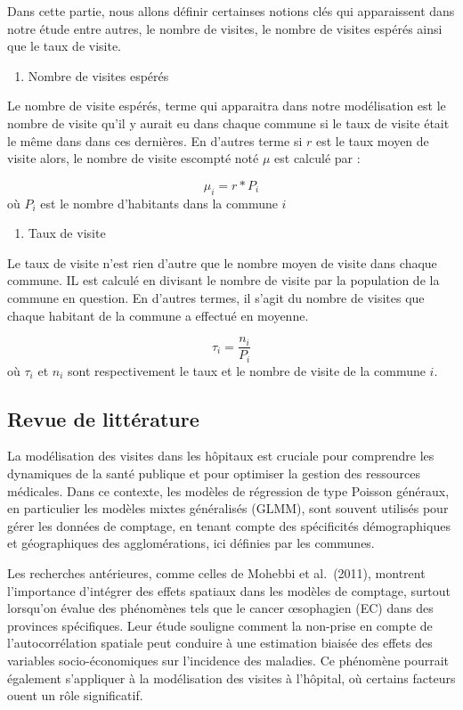 \documentclass[
]{article}
\providecommand{\tightlist}{%
  \setlength{\itemsep}{0pt}\setlength{\parskip}{0pt}}
\begin{document}
Dans cette partie, nous allons définir certainses notions clés qui
apparaissent dans notre étude entre autres, le nombre de visites, le
nombre de visites espérés ainsi que le taux de visite.

\begin{enumerate}
\def\labelenumi{\arabic{enumi}.}
\tightlist
\item
  Nombre de visites espérés
\end{enumerate}

Le nombre de visite espérés, terme qui apparaitra dans notre
modélisation est le nombre de visite qu'il y aurait eu dans chaque
commune si le taux de visite était le même dans dans ces dernières. En
d'autres terme si \(r\) est le taux moyen de visite alors, le nombre de
visite escompté noté \(\mu\) est calculé par :

\[ \mu_i = r * P_i\] où \(P_i\) est le nombre d'habitants dans la
commune \(i\)

\begin{enumerate}
\def\labelenumi{\arabic{enumi}.}
\setcounter{enumi}{1}
\tightlist
\item
  Taux de visite
\end{enumerate}

Le taux de visite n'est rien d'autre que le nombre moyen de visite dans
chaque commune. IL est calculé en divisant le nombre de visite par la
population de la commune en question. En d'autres termes, il s'agit du
nombre de visites que chaque habitant de la commune a effectué en
moyenne.

\[\tau_i = \frac{n_i}{P_i}\] où \(\tau_i\) et \(n_i\) sont
respectivement le taux et le nombre de visite de la commune \(i\).

\subsection{Revue de littérature}\label{revue-de-littuxe9rature}

La modélisation des visites dans les hôpitaux est cruciale pour
comprendre les dynamiques de la santé publique et pour optimiser la
gestion des ressources médicales. Dans ce contexte, les modèles de
régression de type Poisson généraux, en particulier les modèles mixtes
généralisés (GLMM), sont souvent utilisés pour gérer les données de
comptage, en tenant compte des spécificités démographiques et
géographiques des agglomérations, ici définies par les communes.

Les recherches antérieures, comme celles de Mohebbi et al.~(2011),
montrent l'importance d'intégrer des effets spatiaux dans les modèles de
comptage, surtout lorsqu'on évalue des phénomènes tels que le cancer
œsophagien (EC) dans des provinces spécifiques. Leur étude souligne
comment la non-prise en compte de l'autocorrélation spatiale peut
conduire à une estimation biaisée des effets des variables
socio-économiques sur l'incidence des maladies. Ce phénomène pourrait
également s'appliquer à la modélisation des visites à l'hôpital, où
certains facteurs ouent un rôle significatif.
\end{document}
